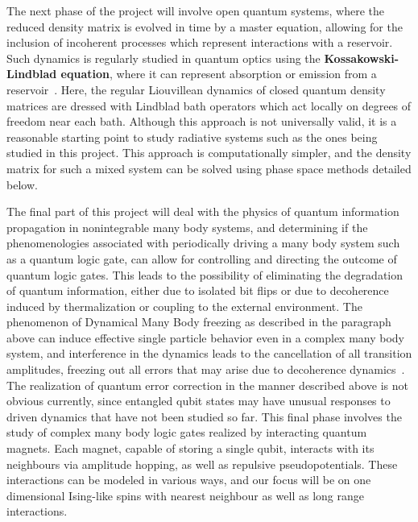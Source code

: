 \documentclass[a4paper,11pt,color]{article}
\begin{document}
The next phase of the project will involve  open quantum systems, where the reduced density matrix is evolved in time by a master equation, allowing for the inclusion of incoherent processes which represent interactions with a reservoir. Such dynamics is regularly studied in quantum optics using the \textbf{Kossakowski-Lindblad equation}, where it can represent absorption or emission from a reservoir~\cite{lindblad}. Here, the regular Liouvillean dynamics of closed quantum density matrices are dressed with Lindblad bath operators which act locally on degrees of freedom near each bath. Although this approach is not universally valid, it is a reasonable starting point to study radiative systems such as the ones being studied in this project.  This approach is computationally simpler, and the density matrix for such a mixed system can be solved using phase space methods detailed below.

The final part of this project will deal with the physics of quantum information propagation in nonintegrable many body systems, and determining if the phenomenologies associated with periodically driving a many body system such as a quantum logic gate, can allow for
controlling and directing the outcome of quantum logic gates. This leads to the possibility of eliminating the degradation of quantum information, either due to isolated bit flips or due to decoherence induced by thermalization or coupling to the external environment.  The phenomenon of Dynamical Many Body freezing as described in the paragraph above can induce effective single particle behavior even in a complex many body system, and interference in the dynamics leads to the  cancellation of all transition amplitudes, freezing out all errors that may arise due to decoherence dynamics~\cite{freezing}. The realization of quantum error correction in the manner described above is not obvious currently, since entangled qubit states may have unusual responses to driven dynamics that have not been studied so far. This final phase  involves the study of complex many body logic gates realized by interacting quantum magnets. Each magnet, capable of storing a single qubit, interacts with its neighbours via amplitude hopping, as well as repulsive pseudopotentials. These interactions can be modeled in various ways, and our focus will be on one dimensional Ising-like spins with nearest neighbour as well as long range interactions. 
\end{document}
